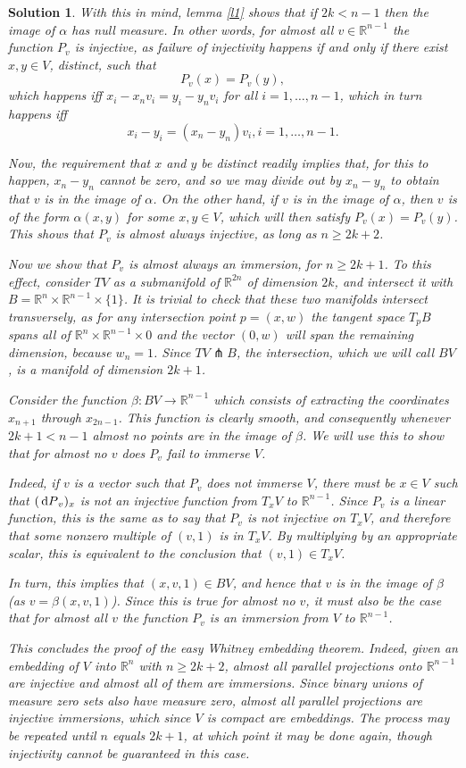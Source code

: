 \documentclass{article}
\theoremstyle{nonumberplain}
\newtheorem{sol}{Solution}
\newcommand{\R}{\mathbb{R}}
\begin{document}
\begin{sol}
With this in mind, lemma \ref{l1} shows that if $2k < n-1$ then the image of $\alpha$ has null measure. In other words, for almost all $v \in \R^{n-1}$ the function $P_v$ is injective, as failure of injectivity happens if and only if there exist $x, y \in V$, distinct, such that
\[P_v(x) = P_v(y),\]
which happens iff $x_i - x_n v_i = y_i - y_n v_i$ for all $i = 1, \dots, n-1$, which in turn happens iff
\[x_i - y_i = (x_n - y_n) v_i, i = 1, \dots, n-1.\]

Now, the requirement that $x$ and $y$ be distinct readily implies that, for this to happen, $x_n - y_n$ cannot be zero, and so we may divide out by $x_n - y_n$ to obtain that $v$ is in the image of $\alpha$. On the other hand, if $v$ is in the image of $\alpha$, then $v$ is of the form $\alpha(x,y)$ for some $x,y \in V$, which will then satisfy $P_v(x) = P_v(y)$. This shows that $P_v$ is almost always injective, as long as $n \geq 2k + 2$.

Now we show that $P_v$ is almost always an immersion, for $n \geq 2k + 1$. To this effect, consider $TV$ as a submanifold of $\R^{2n}$ of dimension $2k$, and intersect it with $B = \R^n \times \R^{n-1} \times \{1\}$. It is trivial to check that these two manifolds intersect transversely, as for any intersection point $p = (x,w)$ the tangent space $T_p B$ spans all of $\R^n \times \R^{n-1} \times 0$ and the vector $(0,w)$ will span the remaining dimension, because $w_n = 1$. Since $TV \pitchfork B$, the intersection, which we will call $BV$, is a manifold of dimension $2k + 1$.

Consider the function $\beta \colon BV \to \R^{n-1}$ which consists of extracting the coordinates $x_{n+1}$ through $x_{2n-1}$. This function is clearly smooth, and consequently whenever $2k+1 < n-1$ almost no points are in the image of $\beta$. We will use this to show that for almost no $v$ does $P_v$ fail to immerse $V$.

Indeed, if $v$ is a vector such that $P_v$ does not immerse $V$, there must be $x \in V$ such that $(\dl P_v)_x$ is not an injective function from $T_x V$ to $\R^{n-1}$. Since $P_v$ is a linear function, this is the same as to say that $P_v$ is not injective on $T_x V$, and therefore that some nonzero multiple of $(v,1)$ is in $T_x V$. By multiplying by an appropriate scalar, this is equivalent to the conclusion that $(v,1) \in T_x V$.

In turn, this implies that $(x,v,1) \in BV$, and hence that $v$ is in the image of $\beta$ (as $v = \beta(x,v,1)$). Since this is true for almost no $v$, it must also be the case that for almost all $v$ the function $P_v$ is an immersion from $V$ to $\R^{n-1}$.

This concludes the proof of the easy Whitney embedding theorem. Indeed, given an embedding of $V$ into $\R^n$ with $n \geq 2k+2$, almost all parallel projections onto $\R^{n-1}$ are injective and almost all of them are immersions. Since binary unions of measure zero sets also have measure zero, almost all parallel projections are injective immersions, which since $V$ is compact are embeddings. The process may be repeated until $n$ equals $2k+1$, at which point it may be done again, though injectivity cannot be guaranteed in this case.
\end{sol}
\end{document}
